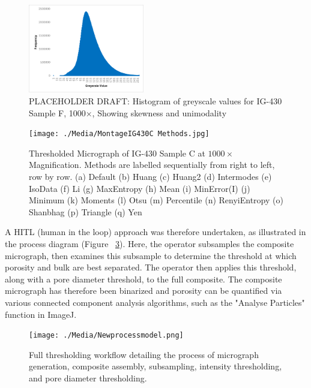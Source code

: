 \documentclass[3p,twocolumn]{elsarticle}
\begin{document}
    \begin{figure}
		\centering
    \includegraphics[width=0.45\textwidth]{./Media/IG430F Greyscale Histogram.png}
		\caption{PLACEHOLDER DRAFT: Histogram of greyscale values for IG-430 Sample F, 1000×, Showing skewness and unimodality}
		\label{fig:histogramnobimodal}
	\end{figure} 

	\begin{figure}[!htbp]
		\centering
		\texttt{[image: ./Media/MontageIG430C Methods.jpg]}
		\caption{Thresholded Micrograph of IG-430 Sample C at $1000\times$ Magnification. Methods are labelled sequentially from right to left, row by row. (a) Default
			(b) Huang
			(c) Huang2
			(d) Intermodes
			(e) IsoData
			(f) Li
			(g) MaxEntropy
			(h) Mean
			(i) MinError(I)
			(j) Minimum
			(k) Moments
			(l) Otsu
			(m) Percentile
			(n) RenyiEntropy
			(o) Shanbhag
			(p) Triangle
			(q) Yen}
		\label{fig:Try All Thresholding Methods}
	\end{figure}  

	A HITL (human in the loop) approach was therefore undertaken, as illustrated
	in the  process diagram (Figure ~\ref{fig:Final Workflow}). Here, the operator
	subsamples the composite micrograph, then examines this subsample to
	determine the threshold at which porosity and bulk are best separated. The
	operator then applies this threshold, along with a pore diameter threshold, to
	the full composite. The composite micrograph has therefore been binarized and 
  porosity can be quantified via various connected component analysis
  algorithms, such as the "Analyse Particles" function in ImageJ.

\begin{figure}[!htbp]
    \centering
    \texttt{[image: ./Media/Newprocessmodel.png]}
    \caption{Full thresholding workflow detailing the process of micrograph generation,
     composite assembly, subsampling, intensity thresholding, and pore diameter thresholding.}
    \label{fig:Final Workflow}
\end{figure}
\end{document}
